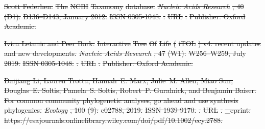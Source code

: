 \documentclass[oupdraft]{sysbio_sse}
\providecommand{\DIFdel}[1]{{\protect\color{red}\sout{#1}}}                      %
\begin{document}
\DIFdel{Scott Federhen.
}%
\DIFdel{The }%
\DIFdel{NCBI}%
\DIFdel{Taxonomy}%
\DIFdel{database.
}%
\emph{\DIFdel{Nucleic Acids Research}}%
\DIFdel{, 40}%
\DIFdel{(D1):}%
\DIFdel{D136--D143,
  January 2012.
}%
\DIFdel{ISSN 0305-1048.
}%
\DIFdel{.
}%
\DIFdel{URL }%
\DIFdel{.
}%
\DIFdel{Publisher: Oxford Academic.
}%

\DIFdel{Ivica Letunic and Peer Bork.
}%
\DIFdel{Interactive }%
\DIFdel{Tree}%
\DIFdel{Of}%
\DIFdel{Life}%
\DIFdel{(}%
\DIFdel{iTOL}%
\DIFdel{) v4: recent updates and new
  developments.
}%
\emph{\DIFdel{Nucleic Acids Research}}%
\DIFdel{, 47}%
\DIFdel{(W1):}%
\DIFdel{W256--W259,
  July 2019.
}%
\DIFdel{ISSN 0305-1048.
}%
\DIFdel{.
}%
\DIFdel{URL }%
\DIFdel{.
}%
\DIFdel{Publisher: Oxford Academic.
}%

\DIFdel{Daijiang Li, Lauren Trotta, Hannah~E. Marx, Julie~M. Allen, Miao Sun,
  Douglas~E. Soltis, Pamela~S. Soltis, Robert~P. Guralnick, and Benjamin
  Baiser.
}%
\DIFdel{For common community phylogenetic analyses, go ahead and use
  synthesis phylogenies.
}%
\emph{\DIFdel{Ecology}}%
\DIFdel{, 100}%
\DIFdel{(9):}%
\DIFdel{e02788, 2019.
}%
\DIFdel{ISSN 1939-9170.
}%
\DIFdel{.
}%
\DIFdel{URL
  }%
\DIFdel{.
}%
\DIFdel{\_eprint:
  https://esajournals.onlinelibrary.wiley.com/doi/pdf/10.1002/ecy.2788.
}%
\end{document}
